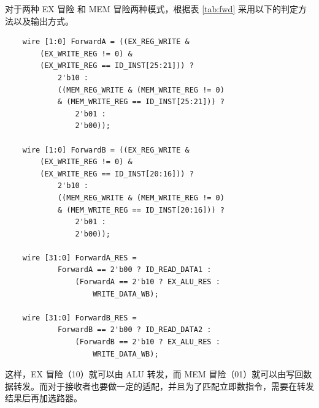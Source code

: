 \documentclass[a4paper,UTF8]{ctexart}
\begin{document}
对于两种 EX 冒险 和 MEM 冒险两种模式，根据表 \ref{tab:fwd} 采用以下的判定方法以及输出方式。

\begin{lstlisting}
    wire [1:0] ForwardA = ((EX_REG_WRITE & 
        (EX_WRITE_REG != 0) & 
        (EX_WRITE_REG == ID_INST[25:21])) ? 
            2'b10 : 
            ((MEM_REG_WRITE & (MEM_WRITE_REG != 0) 
            & (MEM_WRITE_REG == ID_INST[25:21])) ? 
                2'b01 : 
                2'b00));
    
    wire [1:0] ForwardB = ((EX_REG_WRITE & 
        (EX_WRITE_REG != 0) & 
        (EX_WRITE_REG == ID_INST[20:16])) ? 
            2'b10 :
            ((MEM_REG_WRITE & (MEM_WRITE_REG != 0) 
            & (MEM_WRITE_REG == ID_INST[20:16])) ? 
                2'b01 : 
                2'b00));

    wire [31:0] ForwardA_RES = 
            ForwardA == 2'b00 ? ID_READ_DATA1 :
                (ForwardA == 2'b10 ? EX_ALU_RES : 
                    WRITE_DATA_WB);
    
    wire [31:0] ForwardB_RES =
            ForwardB == 2'b00 ? ID_READ_DATA2 :
                (ForwardB == 2'b10 ? EX_ALU_RES :
                    WRITE_DATA_WB);
\end{lstlisting}

这样，EX 冒险（10）就可以由 ALU 转发，而 MEM 冒险（01）就可以由写回数据转发。而对于接收者也要做一定的适配，并且为了匹配立即数指令，需要在转发结果后再加选路器。




\end{document}
